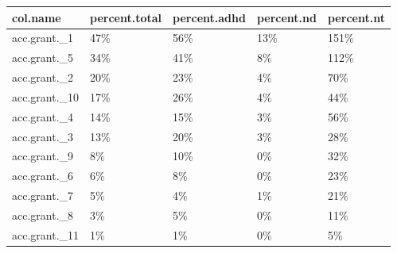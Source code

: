 \begin{table}[ht]
\centering
\begin{tabular}{lllll}
  \hline
col.name & percent.total & percent.adhd & percent.nd & percent.nt \\ 
  \hline
acc.grant.\_1 & 47\% & 56\% & 13\% & 151\% \\ 
  acc.grant.\_5 & 34\% & 41\% & 8\% & 112\% \\ 
  acc.grant.\_2 & 20\% & 23\% & 4\% & 70\% \\ 
  acc.grant.\_10 & 17\% & 26\% & 4\% & 44\% \\ 
  acc.grant.\_4 & 14\% & 15\% & 3\% & 56\% \\ 
  acc.grant.\_3 & 13\% & 20\% & 3\% & 28\% \\ 
  acc.grant.\_9 & 8\% & 10\% & 0\% & 32\% \\ 
  acc.grant.\_6 & 6\% & 8\% & 0\% & 23\% \\ 
  acc.grant.\_7 & 5\% & 4\% & 1\% & 21\% \\ 
  acc.grant.\_8 & 3\% & 5\% & 0\% & 11\% \\ 
  acc.grant.\_11 & 1\% & 1\% & 0\% & 5\% \\ 
   \hline
\end{tabular}
\end{table}

